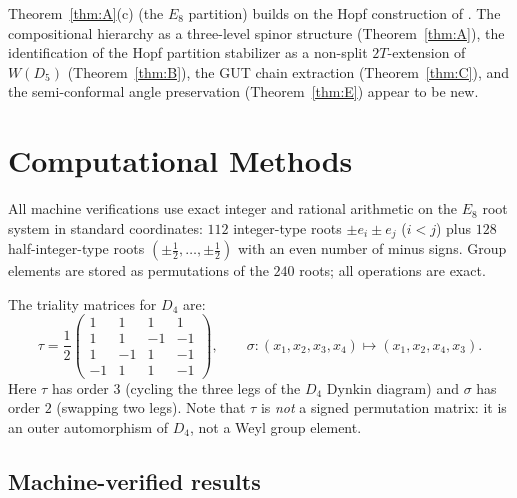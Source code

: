 \documentclass[11pt,reqno]{amsart}
\theoremstyle{plain}
\theoremstyle{definition}
\theoremstyle{remark}
\begin{document}
Theorem~\ref{thm:A}(c) (the $E_8$ partition) builds on the
Hopf construction of \cite{ClawsonFangIrwin2024}.
The compositional hierarchy as a three-level spinor
structure (Theorem~\ref{thm:A}),
the identification of the Hopf partition stabilizer as a
non-split $2T$-extension of $W(D_5)$ (Theorem~\ref{thm:B}),
the GUT chain extraction (Theorem~\ref{thm:C}),
and the semi-conformal angle preservation
(Theorem~\ref{thm:E}) appear to be new.


\appendix

\section{Computational Methods}\label{app:computation}

All machine verifications use exact integer and rational
arithmetic on the $E_8$ root system in standard coordinates:
$112$ integer-type roots $\pm e_i \pm e_j$ ($i < j$) plus
$128$ half-integer-type roots
$(\pm\tfrac{1}{2},\ldots,\pm\tfrac{1}{2})$ with an even
number of minus signs.
Group elements are stored as permutations of the $240$ roots;
all operations are exact.

The triality matrices for $D_4$ are:
\[
  \tau = \frac{1}{2}
  \begin{pmatrix}
    1 & 1 & 1 & 1 \\
    1 & 1 & -1 & -1 \\
    1 & -1 & 1 & -1 \\
    -1 & 1 & 1 & -1
  \end{pmatrix},
  \qquad
  \sigma\colon (x_1, x_2, x_3, x_4) \mapsto (x_1, x_2, x_4, x_3).
\]
Here $\tau$ has order $3$ (cycling the three legs of the $D_4$
Dynkin diagram) and $\sigma$ has order $2$ (swapping two legs).
Note that $\tau$ is \emph{not} a signed permutation matrix:
it is an outer automorphism of $D_4$, not a Weyl group element.

\subsection{Machine-verified results}
\end{document}
